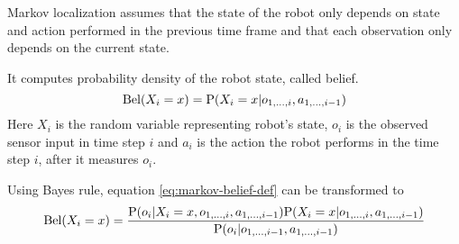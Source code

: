 Markov localization assumes that the state of the robot only depends
on state and action performed in the previous time frame
and that each observation only depends on the current state.

It computes probability density of the robot state, called belief.
\begin{equation}
	\label{eq:markov-belief-def}
	\mathrm{Bel}(X_i = x) = \mathrm{P}(X_i = x | o_{1, \dotsc, i}, a_{1,\dotsc,i - 1})
\end{equation}
Here \(X_i\) is the random variable representing robot's state,
\(o_i\) is the observed sensor input in time step \(i\) and \(a_i\)
is the action the robot performs in the time step \(i\), after it
measures \(o_i\).

Using Bayes rule, equation \eqref{eq:markov-belief-def} can be transformed to
\begin{equation}
	\label{eq:markov-derivation1}
	\mathrm{Bel}(X_i = x) =
	\frac{
		\mathrm{P}(o_i | X_i = x, o_{1, \dotsc, i}, a_{1,\dotsc,i - 1})
		\mathrm{P}(X_i = x | o_{1, \dotsc, i}, a_{1, \dotsc, i - 1})
	}{
		\mathrm{P}(o_i | o_{1, \dotsc, i-1}, a_{1, \dotsc, i-1})
	}
\end{equation}

